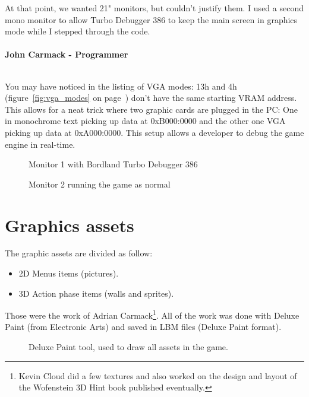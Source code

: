 \documentclass[book.tex]{subfiles}
\begin{document}
\begin{fancyquotes}
At that point, we wanted 21" monitors, but couldn't justify them.  I used a second mono monitor to allow Turbo Debugger 386 to keep the main screen in graphics mode while I stepped through the code.\\
 \\
\textbf{John Carmack - Programmer}
\end{fancyquotes}
\\
You may have noticed in the listing of VGA modes: 13h and 4h (figure~\ref{fig:vga_modes} on page~\pageref{fig:vga_modes})  don't have the same starting VRAM address. This allows for a neat trick where two graphic cards are plugged in the PC: One in monochrome text picking up data at 0xB000:0000 and the other one VGA picking up data at 0xA000:0000. This setup allows a developer to debug the game engine in real-time.\\
\begin{figure}[H]
\centering
\caption{Monitor 1 with Bordland Turbo Debugger 386}
\label{fig:dm1}
\end{figure}

\begin{figure}[H]
\centering
\caption{Monitor 2 running the game as normal}
\label{fig:dm1}
\end{figure}



 
 
 




\section{Graphics assets}
The graphic assets are divided as follow:
\begin{itemize}
\item 2D Menus items (pictures).
\item 3D Action phase items (walls and sprites).
\end{itemize}
Those were the work of Adrian Carmack\footnote{Kevin Cloud did a few textures and also worked on the design and layout of the Wofenstein 3D Hint book published eventually.}. All of the work was done with Deluxe Paint (from Electronic Arts) and saved in LBM files (Deluxe Paint format). 

\begin{figure}[H]
  \centering
 \caption{Deluxe Paint tool, used to draw all assets in the game.}
\end{figure}
\end{document}

